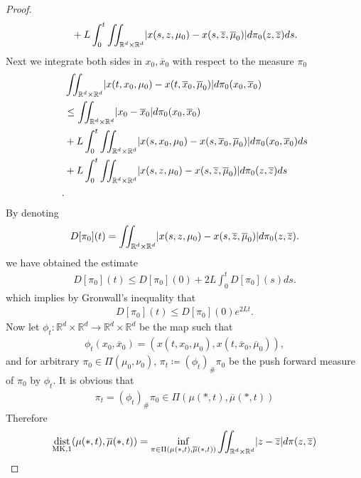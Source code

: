 \begin{proof}
\begin{alignat*}{3}
  &  &&+L \int_0^{t} \iint_{\mathbb{R}^{d} \times  \mathbb{R}^{d}  }  \lvert x(s,z,\mu_0) - x(s,\overline{z},\overline{\mu }_0  )\rvert  d\pi_0(z,\overline{z} ) ds
.\end{alignat*}
Next we integrate both sides in $x_{0},\overline{x}_0 $ with respect to the measure $\pi_0$
\begin{align*}
  &\iint_{\mathbb{R}^{d} \times  \mathbb{R}^{d}  }\lvert x(t,x_{0},\mu_0) - x(t,\overline{x}_0,\overline{\mu }_0  )\rvert d\pi_0(x_{0},\overline{x}_0 )\\
  &\le  \iint_{\mathbb{R}^{d}\times \mathbb{R}^{d}  }\lvert x_{0}-\overline{x}_0 \rvert d\pi_0(x_{0},\overline{x}_0 )\\
  &+ L \int_0^{t} \iint_{\mathbb{R}^{d} \times  \mathbb{R}^{d}  }   \lvert x(s,x_{0},\mu_0)-x(s,\overline{x}_0,\overline{\mu }_0  )\rvert d\pi_0(x_{0},\overline{x}_0 ) ds\\
  &+ L \int_0^{t} \iint_{\mathbb{R}^{d} \times  \mathbb{R}^{d}  }   \lvert x(s,z,\mu_0)-x(s,\overline{z},\overline{\mu }_0  )\rvert d\pi_0(z,\overline{z}  ) ds\\
.\end{align*}
By denoting 
\begin{align*}
  D[\pi_0](t) = \iint_{\mathbb{R}^{d}\times \mathbb{R}^{d}  }\lvert x(s,z,\mu_0)-x(s,\overline{z},\overline{\mu }_0  )\rvert d\pi_0(z,\overline{z} )
.\end{align*}
we have obtained the estimate 
\begin{align*}
  D[\pi_0](t) \le  D[\pi_0](0) + 2L\int_0^{t}D[\pi_{0}] (s) ds
.\end{align*}
which implies by Gronwall's inequality that 
\begin{align*}
  D[\pi_0](t) \le D[\pi_0](0)e^{2Lt} 
.\end{align*}
Now let $\phi_t : \mathbb{R}^{d} \times  \mathbb{R}^{d} \to  \mathbb{R}^{d} \times  \mathbb{R}^{d}    $ be the map such that 
\begin{align*}
  \phi_t(x_{0},\overline{x}_0 ) = (x(t,x_{0},\mu_0),x(t,\overline{x}_0,\overline{\mu }_0  )),
\end{align*}
and for arbitrary $\pi_0 \in  \Pi(\mu_0,\nu_0)$, $\pi_t \coloneqq  (\phi_t)_\# \pi_0$ be the push forward measure of $\pi_0$ by $\phi_t$.
It is obvious that 
\begin{align*}
  \pi_t = (\phi_t)_\# \pi_0 \in  \Pi(\mu(*,t),\overline{\mu }(*,t) )
\end{align*}
Therefore 
\begin{align*}
  \dist_{\text{MK},1}(\mu(*,t),\overline{\mu }(*,t) ) &= \inf_{\pi \in \Pi(\mu(*,t),\overline{\mu }(*,t) ) } \iint_{\mathbb{R}^{d} \times  \mathbb{R}^{d}  } \abs{z-\overline{z} } d\pi(z,\overline{z} )\\

\end{align*}
\end{proof}
